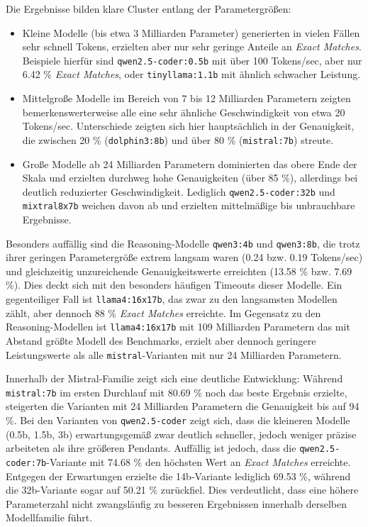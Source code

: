 Die Ergebnisse bilden klare Cluster entlang der Parametergrößen:
\begin{itemize}
    \item Kleine Modelle (bis etwa \num{3} Milliarden Parameter) generierten in vielen Fällen sehr schnell Tokens, erzielten aber nur sehr geringe Anteile an \textit{Exact Matches}. Beispiele hierfür sind \texttt{qwen2.5-coder:0.5b} mit über \num{100} Tokens/sec, aber nur \num{6.42} \% \textit{Exact Matches}, oder \texttt{tinyllama:1.1b} mit ähnlich schwacher Leistung.
    \item Mittelgroße Modelle im Bereich von \num{7} bis \num{12} Milliarden Parametern zeigten bemerkenswerterweise alle eine sehr ähnliche Geschwindigkeit von etwa \num{20} Tokens/sec. Unterschiede zeigten sich hier hauptsächlich in der Genauigkeit, die zwischen \num{20} \% (\texttt{dolphin3:8b}) und über \num{80} \% (\texttt{mistral:7b}) streute.
    \item Große Modelle ab \num{24} Milliarden Parametern dominierten das obere Ende der Skala und erzielten durchweg hohe Genauigkeiten (über \num{85} \%), allerdings bei deutlich reduzierter Geschwindigkeit. Lediglich \texttt{qwen2.5-coder:32b} und \texttt{mixtral8x7b} weichen davon ab und erzielten mittelmäßige bis unbrauchbare Ergebnisse.
\end{itemize}

Besonders auffällig sind die Reasoning-Modelle \texttt{qwen3:4b} und \texttt{qwen3:8b}, die trotz ihrer geringen Parametergröße extrem langsam waren (\num{0.24} bzw. \num{0.19} Tokens/sec) und gleichzeitig unzureichende Genauigkeitswerte erreichten (\num{13.58} \% bzw. \num{7.69} \%). Dies deckt sich mit den besonders häufigen Timeouts dieser Modelle.
Ein gegenteiliger Fall ist \texttt{llama4:16x17b}, das zwar zu den langsamsten Modellen zählt, aber dennoch \num{88} \% \textit{Exact Matches} erreichte.
Im Gegensatz zu den Reasoning-Modellen ist \texttt{llama4:16x17b} mit 109 Milliarden Parametern das mit Abstand größte Modell des Benchmarks, erzielt aber dennoch geringere Leistungswerte als alle \texttt{mistral}-Varianten mit nur \num{24} Milliarden Parametern.

Innerhalb der Mistral-Familie zeigt sich eine deutliche Entwicklung: Während \texttt{mistral:7b} im ersten Durchlauf mit \num{80.69} \% noch das beste Ergebnis erzielte, steigerten die Varianten mit \num{24} Milliarden Parametern die Genauigkeit bis auf \num{94}  \%.
Bei den Varianten von \texttt{qwen2.5-coder} zeigt sich, dass die kleineren Modelle (0.5b, 1.5b, 3b) erwartungsgemäß zwar deutlich schneller, jedoch weniger präzise arbeiteten als ihre größeren Pendants.
Auffällig ist jedoch, dass die \texttt{qwen2.5-coder:7b}-Variante mit \num{74,68} \% den höchsten Wert an \textit{Exact Matches} erreichte.
Entgegen der Erwartungen erzielte die 14b-Variante lediglich \num{69,53} \%, während die 32b-Variante sogar auf \num{50,21} \% zurückfiel.
Dies verdeutlicht, dass eine höhere Parameterzahl nicht zwangsläufig zu besseren Ergebnissen innerhalb derselben Modellfamilie führt.

